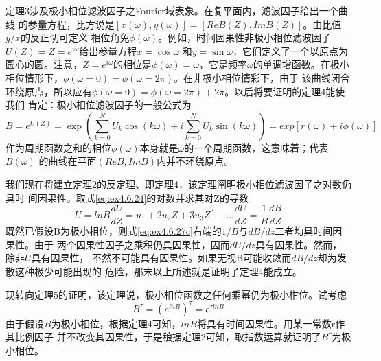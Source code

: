 定理3涉及极小相位滤波因子之Fourier域表象。在复平面内，滤波因子给出一个曲线
的参量方程，比方说是$[x(\omega),y(\omega)]=[ReB(Z),ImB(Z)]$。由比值$y/x$的反正切可定义
相位角免$\phi(\omega)$。例如，时间因果性非极小相位滤波因子$U(Z)=Z=e^{i\omega}$给出参量方程$x=\cos\omega$
和$y=\sin\omega$，它们定义了一个以原点为圆心的圆。注意，$Z=e^{i\omega}$的相位是$\phi (\omega)=\omega$，它是频率$\omega$的单调增函数。在极小相位情形下，$\phi(\omega=0)=\phi(\omega=2\pi)$。在非极小相位情彩下，由于
该曲线闭合环绕原点，所以应有$\phi(\omega=0)=\phi(\omega=2\pi)+2\pi$。以后将要证明的定理4能使我们
肯定：极小相位滤波因子的一般公式为
\begin{subequations}
\begin{equation}
B=e^{U(Z)}=\exp(\sum_{k=0}^NU_k\cos(k\omega)+i\sum_{k=0}^NU_k\sin(k\omega))
\label{eq:ex4.6.26a}
\end{equation}
\begin{equation}
=exp[r(\omega)+i\phi(\omega)]
\label{eq:ex4.6.26b}
\end{equation}
\label{eq:ex4.6.26}
\end{subequations}
作为周期函数之和的相位$\phi(\omega)$本身就是$\omega$的一个周期函数，这意味着；代表$B(\omega)$
的曲线在平面$(ReB,ImB)$内并不环绕原点。

我们现在将建立定理2的反定理、即定理4，该定理阐明极小相位滤波因子之对数仍具时
间因果性。取式\ref{eq:ex4.6.24}的对数并求其对Z的导数
\begin{subequations}
\begin{equation}
U=lnB
\label{eq:ex4.6.27a}
\end{equation}
\begin{equation}
\frac{dU}{dZ}=u_1+2u_2Z+
3u_3Z^3+...
\label{eq:ex4.6.27b}
\end{equation}
\begin{equation}
\frac{dU}{dZ}=\frac{1}{B}\frac{dB}{dZ}
\label{eq:ex4.6.27c}
\end{equation}
\label{eq:ex4.6.27}
\end{subequations}
既然已假设B为极小相位，则式\ref{eq:ex4.6.27c}右端的$1/B$与$dB/dz$二者均具时间因果性。由于
两个因果性因子之乘积仍具因果性，因而$dU/dz$具有因果性。然而，除非$U$具有因果性，
不然不可能具有因果性。如果无视B可能收敛而$dB/dz$却为发散这种极少可能出现的
危险，那末以上所述就是证明了定理4能成立。

现转向定理5的证明，该定理说，极小相位函数之任何乘幂仍为极小柑位。试考虑
\begin{equation}
B^{\tau}=(e^{lnB})^{\tau}=e^{\tau lnB}
\label{eq:ex4.6.28}
\end{equation}
由于假设$B$为极小相位，根据定理4可知，$lnB$将具有时间因果性。用某一常数r作其比例因子
并不改变其因果性，于是稂据定理2可知，取指数运算就证明了$B^\tau$为极小相位。

